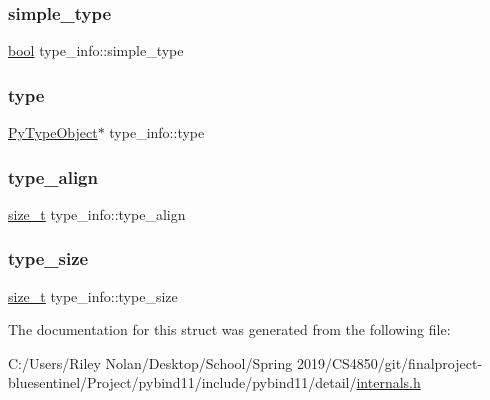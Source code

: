 \mbox{\label{structtype__info_a106e005c60fd65fbf01569e25b52fe50}} 
\subsubsection{\texorpdfstring{simple\_type}{simple\_type}}
{\footnotesize\ttfamily \mbox{\hyperlink{asdl_8h_af6a258d8f3ee5206d682d799316314b1}{bool}} type\+\_\+info\+::simple\+\_\+type}

\mbox{\label{structtype__info_a9d303522ded86597dda91813722a39cc}} 
\subsubsection{\texorpdfstring{type}{type}}
{\footnotesize\ttfamily \mbox{\hyperlink{_python27_2object_8h_a42a55dd6e973872c7a6bc61632070f6f}{Py\+Type\+Object}}$\ast$ type\+\_\+info\+::type}

\mbox{\label{structtype__info_aacdceab2742cfbc06be7a1be1679ff34}} 
\subsubsection{\texorpdfstring{type\_align}{type\_align}}
{\footnotesize\ttfamily \mbox{\hyperlink{detail_2common_8h_a801d6a451a01953ef8cbae6feb6a3638}{size\+\_\+t}} type\+\_\+info\+::type\+\_\+align}

\mbox{\label{structtype__info_a5030f67ec35a633be08c1b2dc868975b}} 
\subsubsection{\texorpdfstring{type\_size}{type\_size}}
{\footnotesize\ttfamily \mbox{\hyperlink{detail_2common_8h_a801d6a451a01953ef8cbae6feb6a3638}{size\+\_\+t}} type\+\_\+info\+::type\+\_\+size}



The documentation for this struct was generated from the following file\+:\begin{DoxyCompactItemize}
\item 
C\+:/\+Users/\+Riley Nolan/\+Desktop/\+School/\+Spring 2019/\+C\+S4850/git/finalproject-\/bluesentinel/\+Project/pybind11/include/pybind11/detail/\mbox{\hyperlink{internals_8h}{internals.\+h}}\end{DoxyCompactItemize}
